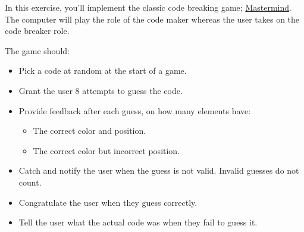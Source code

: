 
In this exercise, you'll implement the classic code breaking game;
\href{https://en.wikipedia.org/wiki/Mastermind_(board_game)}{Mastermind}.
The computer will play the role of the code maker whereas the user takes on the code breaker role.

The game should:
\begin{itemize}
    \item Pick a code at random at the start of a game.
    \item Grant the user $8$ attempts to guess the code.
    \item Provide feedback after each guess, on how many elements have:
    \begin{itemize}
        \item The correct color and position.
        \item The correct color but incorrect position.
    \end{itemize}
    \item Catch and notify the user when the guess is not valid. Invalid guesses do not count.
    \item Congratulate the user when they guess correctly.
    \item Tell the user what the actual code was when they fail to guess it.
\end{itemize}

